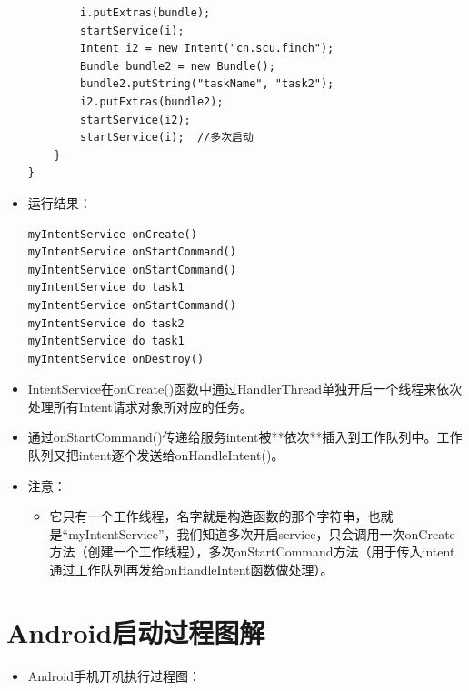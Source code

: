 \documentclass[9pt, b5paper]{article}
\begin{document}
\begin{itemize}
\begin{verbatim}
        i.putExtras(bundle);  
        startService(i);  
        Intent i2 = new Intent("cn.scu.finch");  
        Bundle bundle2 = new Bundle();  
        bundle2.putString("taskName", "task2");  
        i2.putExtras(bundle2);  
        startService(i2); 
        startService(i);  //多次启动
    }
}
\end{verbatim}
\item 运行结果：
\begin{verbatim}
myIntentService onCreate()
myIntentService onStartCommand()
myIntentService onStartCommand()
myIntentService do task1
myIntentService onStartCommand()
myIntentService do task2
myIntentService do task1
myIntentService onDestroy()
\end{verbatim}
\item IntentService在onCreate()函数中通过HandlerThread单独开启一个线程来依次处理所有Intent请求对象所对应的任务。　
\item 通过onStartCommand()传递给服务intent被**依次**插入到工作队列中。工作队列又把intent逐个发送给onHandleIntent()。
\item 注意：
\begin{itemize}
\item 它只有一个工作线程，名字就是构造函数的那个字符串，也就是“myIntentService”，我们知道多次开启service，只会调用一次onCreate方法（创建一个工作线程），多次onStartCommand方法（用于传入intent通过工作队列再发给onHandleIntent函数做处理）。
\end{itemize}
\end{itemize}

\section{Android启动过程图解}
\label{sec-5}
\begin{itemize}
\item Android手机开机执行过程图：
\end{itemize}
\end{document}
